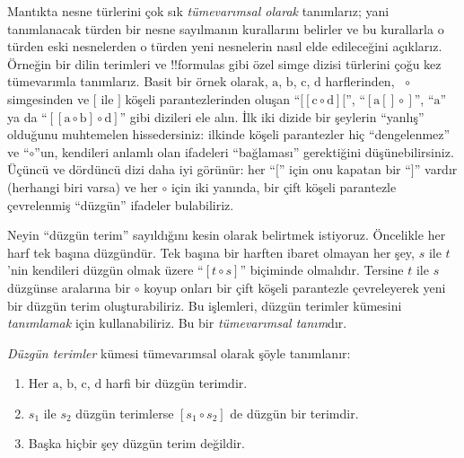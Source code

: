 



Mantıkta nesne türlerini çok sık \emph{tümevarımsal olarak} tanımlarız;
yani tanımlanacak türden bir nesne sayılmanın kurallarını belirler ve bu
kurallarla o türden eski nesnelerden o türden yeni nesnelerin nasıl elde
edileceğini açıklarız. Örneğin bir dilin terimleri ve !!{formula}s gibi
özel simge dizisi türlerini çoğu kez tümevarımla tanımlarız. Basit bir
örnek olarak, $\mathrm{a}$, $\mathrm{b}$, $\mathrm{c}$, $\mathrm{d}$ harflerinden,
~$\circ$ simgesinden ve $[$ ile $]$ köşeli parantezlerinden oluşan
``$[[\mathrm{c} \circ \mathrm{d}][$'', ``$[\mathrm{a}[]\circ]$'',
``$\mathrm{a}$'' ya da ``$[[\mathrm{a} \circ \mathrm{b}]\circ
\mathrm{d}]$'' gibi dizileri ele alın. İlk iki dizide bir şeylerin
``yanlış'' olduğunu muhtemelen hissedersiniz: ilkinde köşeli parantezler
hiç ``dengelenmez'' ve ``$\circ$''un, kendileri anlamlı olan ifadeleri
``bağlaması'' gerektiğini düşünebilirsiniz. Üçüncü ve dördüncü dizi daha
iyi görünür: her ``$[$'' için onu kapatan bir ``$]$'' vardır (herhangi
biri varsa) ve her $\circ$ için iki yanında, bir çift köşeli parantezle
çevrelenmiş ``düzgün'' ifadeler bulabiliriz.

Neyin ``düzgün terim'' sayıldığını kesin olarak belirtmek istiyoruz.
Öncelikle her harf tek başına düzgündür. Tek başına bir harften ibaret
olmayan her şey, $s$ ile $t$'nin kendileri düzgün olmak üzere ``$[t
\circ s]$'' biçiminde olmalıdır. Tersine $t$ ile $s$ düzgünse aralarına
bir $\circ$ koyup onları bir çift köşeli parantezle çevreleyerek yeni
bir düzgün terim oluşturabiliriz. Bu işlemleri, düzgün terimler
kümesini \emph{tanımlamak} için kullanabiliriz. Bu bir \emph{tümevarımsal
  tanım}dır.

\begin{defn}
  \emph{Düzgün terimler} kümesi tümevarımsal olarak şöyle tanımlanır:
  \begin{enumerate}
  \item Her $\mathrm{a}$, $\mathrm{b}$, $\mathrm{c}$, $\mathrm{d}$
    harfi bir düzgün terimdir.
  \item $s_1$ ile $s_2$ düzgün terimlerse $[s_1 \circ s_2]$ de düzgün
    bir terimdir.
  \item Başka hiçbir şey düzgün terim değildir.
  \end{enumerate}
\end{defn}


